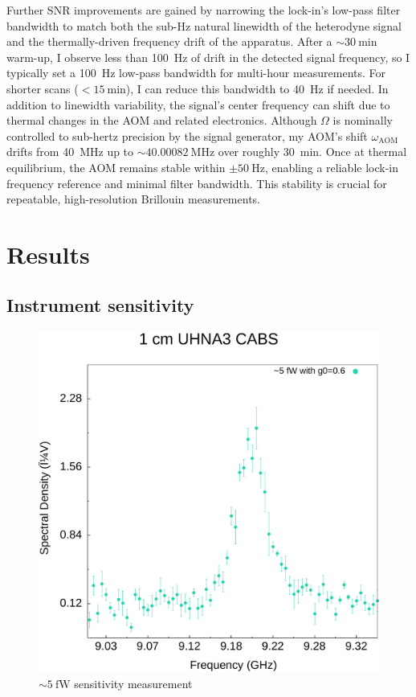 Further SNR improvements are gained by narrowing the lock-in’s low-pass filter bandwidth to match both the sub-\si{\hertz} natural linewidth of the heterodyne signal and the thermally-driven frequency drift of the apparatus. After a \(\sim\!\SI{30}{\minute}\) warm-up, I observe less than \SI{100}{\hertz} of drift in the detected signal frequency, so I typically set a \SI{100}{\hertz} low-pass bandwidth for multi-hour measurements. For shorter scans (\(< \SI{15}{\minute}\)), I can reduce this bandwidth to \SI{40}{\hertz} if needed. In addition to linewidth variability, the signal’s center frequency can shift due to thermal changes in the AOM and related electronics. Although \(\Omega\) is nominally controlled to sub-hertz precision by the signal generator, my AOM’s shift \(\omega_{\mathrm{AOM}}\) drifts from \SI{40}{\mega\hertz} up to \(\sim\!\SI{40.00082}{\mega\hertz}\) over roughly \SI{30}{\minute}. Once at thermal equilibrium, the AOM remains stable within \(\pm\SI{50}{\hertz}\), enabling a reliable lock-in frequency reference and minimal filter bandwidth. This stability is crucial for repeatable, high-resolution Brillouin measurements.

\section{Results}\label{Results}
\subsection{Instrument sensitivity}
\label{Results:Instrument sensitivity and SBS comparison}

\begin{figure}[t]
  \centering
  \includegraphics[width=\textwidth]{figs/4-CABS/5fWSensitivity.pdf}
  \caption{\(\sim\SI{5}{\femto\watt}\) sensitivity measurement}
  \label{fig:5fWSensitivity}
\end{figure}


